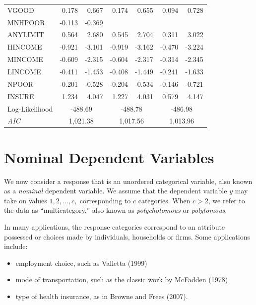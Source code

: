 \begin{table}[h]
\begin{center}
\begin{tabular}{l|rr|rr|rr}
     VGOOD &      0.178 &      0.667 &      0.174 &      0.655 &      0.094 &      0.728 \\
   MNHPOOR &     -0.113 &     -0.369 &            &            &            &            \\
  ANYLIMIT &      0.564 &      2.680 &      0.545 &      2.704 &      0.311 &      3.022 \\ \hline
   HINCOME &     -0.921 &     -3.101 &     -0.919 &     -3.162 &     -0.470 &     -3.224 \\
   MINCOME &     -0.609 &     -2.315 &     -0.604 &     -2.317 &     -0.314 &     -2.345 \\
   LINCOME &     -0.411 &     -1.453 &     -0.408 &     -1.449 &     -0.241 &     -1.633 \\
     NPOOR &     -0.201 &     -0.528 &     -0.204 &     -0.534 &     -0.146 &     -0.721 \\
    INSURE &      1.234 &      4.047 &      1.227 &      4.031 &      0.579 &      4.147 \\
\hline Log-Likelihood & \multicolumn{2}{|c|}{ -488.69} &
\multicolumn{2}{|c|}{-488.78} & \multicolumn{2}{|c}{-486.98} \\
\textit{AIC} & \multicolumn{2}{|c|}{ 1,021.38} &
\multicolumn{2}{|c|}{1,017.56} & \multicolumn{2}{|c}{1,013.96} \\
\hline
\end{tabular}\end{center}\end{table}



\bigskip{}

\section{Nominal Dependent Variables}
We now consider a response that is an unordered categorical
variable, also known as a \emph{nominal} dependent variable. We
assume that the dependent variable $y$ may take on values $1, 2,
\ldots , c,$ corresponding to $c$ categories. When $c>2$, we refer
to the data as ``multicategory,'' also known as \emph{polychotomous}
or \emph{polytomous}.

In many applications, the response categories correspond to an
attribute possessed or choices made by individuals, households or
firms. Some applications include:
\begin{itemize}
  \item employment choice, such as Valletta (1999)
  \item mode of transportation, such as the classic work by
McFadden (1978)
  \item type of health insurance, as in Browne and Frees
  (2007).
\end{itemize}

